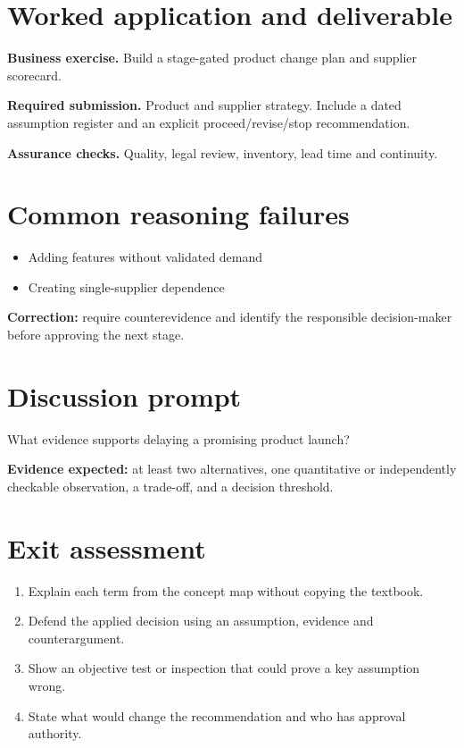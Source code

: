 \documentclass[11pt,letterpaper]{article}
\begin{document}
\section{Worked application and deliverable}
\textbf{Business exercise.} Build a stage-gated product change plan and supplier scorecard.\par\textbf{Required submission.} Product and supplier strategy. Include a dated assumption register and an explicit proceed/revise/stop recommendation.\par\textbf{Assurance checks.} Quality, legal review, inventory, lead time and continuity.
\section{Common reasoning failures}
\begin{itemize}[leftmargin=*,itemsep=3pt]
\item Adding features without validated demand
\item Creating single-supplier dependence
\end{itemize}
\noindent\textbf{Correction:} require counterevidence and identify the responsible decision-maker before approving the next stage.
\section{Discussion prompt}
What evidence supports delaying a promising product launch?\par\medskip\textbf{Evidence expected:} at least two alternatives, one quantitative or independently checkable observation, a trade-off, and a decision threshold.
\section{Exit assessment}
\begin{enumerate}[leftmargin=*,itemsep=5pt]
\item Explain each term from the concept map without copying the textbook.
\item Defend the applied decision using an assumption, evidence and counterargument.
\item Show an objective test or inspection that could prove a key assumption wrong.
\item State what would change the recommendation and who has approval authority.
\end{enumerate}

\end{document}
